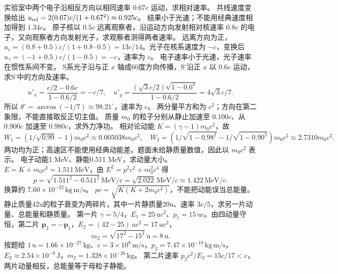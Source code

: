 \problemtext 实验室中两个电子沿相反方向以相同速率 $0.67c$ 运动，求相对速率。
\workings 共线速度变换给出 $u_{\rm rel}=2(0.67)c/(1+0.67^2)\approx0.925c$。
\crosscheck 结果小于光速；不能用经典速度相加得到 $1.34c$。
\problemtext 原子核以 $0.5c$ 远离观察者，沿运动方向发射相对核速率 $0.8c$ 的电子，又向观察者方向发射光子，求观察者测得两者速率。
\workings 远离方向为正，$u_e=(0.8+0.5)c/(1+0.8\cdot0.5)=13c/14$。光子在核系速度为 $-c$，变换后 $u_\gamma=(-1+0.5)c/(1-0.5)=-c$，速率为 $c$。
\crosscheck 电子速率小于光速，光子速率在惯性系间不变。
\problemtext S系光子沿与正 $x$ 轴成60度方向传播，S'沿正 $x$ 以 $0.6c$ 运动，求S'中的方向及速率。
\workings
\[
u'_x=\frac{c/2-0.6c}{1-0.6/2}=-c/7,\quad
u'_y=\frac{(\sqrt3c/2)\sqrt{1-0.6^2}}{1-0.6/2}=4\sqrt3c/7.
\]
所以 $\theta'=\arccos(-1/7)\approx98.21^\circ$，速率为 $c$。
\crosscheck 两分量平方和为 $c^2$；方向在第二象限，不能直接取反正切主值。
\problemtext 质量 $m_0$ 的粒子分别从静止加速至 $0.100c$、从 $0.900c$ 加速至 $0.980c$，求外力净功。
\workings 相对论动能 $K=(\gamma-1)m_0c^2$，故
\[
W_1=(1/\sqrt{0.99}-1)m_0c^2\approx0.005038m_0c^2,
\quad W_2=(1/\sqrt{1-0.98^2}-1/\sqrt{1-0.90^2})m_0c^2
\approx2.7310m_0c^2.
\]
\crosscheck 两功均为正；高速区不能使用经典动能差。题面未给静质量数值，因此以 $m_0c^2$ 表示。
\problemtext 电子动能1 MeV、静能0.511 MeV，求动量大小。
\workings $E=K+m_0c^2=1.511\,\mathrm{MeV}$，由 $E^2=p^2c^2+m_0^2c^4$ 得
\[
p=\sqrt{1.511^2-0.511^2}\,\mathrm{MeV}/c
=\sqrt{2.022}\,\mathrm{MeV}/c\approx1.422\,\mathrm{MeV}/c.
\]
换算约 $7.60\times10^{-22}\,\mathrm{kg\,m/s}$。
\crosscheck $pc=\sqrt{K(K+2m_0c^2)}$，不能把动能误当总能量。
\problemtext 静止质量42u的粒子衰变为两碎片，其中一片静质量20u、速率 $3c/5$，求另一片动量、总能量和静质量。
\workings 第一片 $\gamma=5/4$，$E_1=25\,\mathrm u c^2$、$p_1=15\,\mathrm u c$。由四动量守恒，第二片 $\bm p_2=-\bm p_1$，$E_2=(42-25)\,\mathrm u c^2=17\,\mathrm u c^2$，
\[
m_2=\sqrt{17^2-15^2}\,\mathrm u=8\,\mathrm u .
\]
按题给 $1\,\mathrm u=1.66\times10^{-27}\,\mathrm{kg}$、$c=3\times10^8\,\mathrm{m/s}$，$p_2=7.47\times10^{-18}\,\mathrm{kg\,m/s}$，$E_2\approx2.54\times10^{-9}\,\mathrm J$，$m_2=1.328\times10^{-26}\,\mathrm{kg}$。
\crosscheck 第二片速率 $p_2c^2/E_2=15c/17<c$，两片动量相反，总能量等于母粒子静能。
